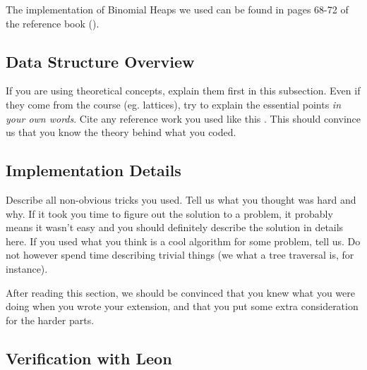 The implementation of Binomial Heaps we used can be found 
in pages 68-72 of the reference book (\cite{Okasaki}).

\subsection{Data Structure Overview}
If you are using theoretical concepts, explain them first in this subsection.
Even if they come from the course (eg. lattices), try to explain the essential
points \emph{in your own words}. Cite any reference work you used like this
\cite{TigerBook}. This should convince us that you know the theory behind what
you coded. 

\subsection{Implementation Details}
Describe all non-obvious tricks you used. Tell us what you thought was hard and
why. If it took you time to figure out the solution to a problem, it probably
means it wasn't easy and you should definitely describe the solution in details
here. If you used what you think is a cool algorithm for some problem, tell us.
Do not however spend time describing trivial things (we what a tree traversal
is, for instance). 

After reading this section, we should be convinced that you knew what you were
doing when you wrote your extension, and that you put some extra consideration
for the harder parts.

\subsection{Verification with Leon}
